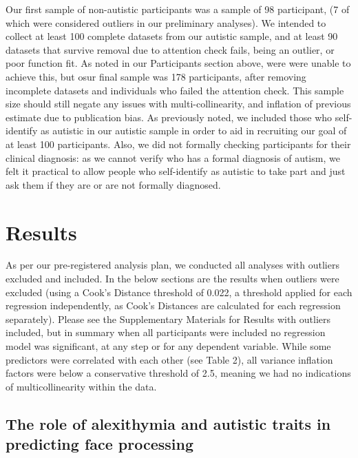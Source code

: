 \documentclass[
]{article}
\begin{document}
Our first sample of non-autistic participants was a sample of 98 participant, (7 of which were considered outliers in our preliminary analyses). We intended to collect at least 100 complete datasets from our autistic sample, and at least 90 datasets that survive removal due to attention check fails, being an outlier, or poor function fit. As noted in our Participants section above, were were unable to achieve this, but osur final sample was 178 participants, after removing incomplete datasets and individuals who failed the attention check. This sample size should still negate any issues with multi-collinearity, and inflation of previous estimate due to publication bias. As previously noted, we included those who self-identify as autistic in our autistic sample in order to aid in recruiting our goal of at least 100 participants. Also, we did not formally checking participants for their clinical diagnosis: as we cannot verify who has a formal diagnosis of autism, we felt it practical to allow people who self-identify as autistic to take part and just ask them if they are or are not formally diagnosed.

\hypertarget{results}{%
\section*{Results}\label{results}}

As per our pre-registered analysis plan, we conducted all analyses with outliers excluded and included. In the below sections are the results when outliers were excluded (using a Cook's Distance threshold of 0.022, a threshold applied for each regression independently, as Cook's Distances are calculated for each regression separately). Please see the Supplementary Materials for Results with outliers included, but in summary when all participants were included no regression model was significant, at any step or for any dependent variable. While some predictors were correlated with each other (see Table 2), all variance inflation factors were below a conservative threshold of 2.5, meaning we had no indications of multicollinearity within the data.

\hypertarget{the-role-of-alexithymia-and-autistic-traits-in-predicting-face-processing}{%
\subsection*{The role of alexithymia and autistic traits in predicting face processing}\label{the-role-of-alexithymia-and-autistic-traits-in-predicting-face-processing}}
\end{document}
